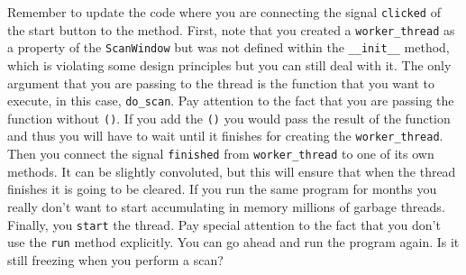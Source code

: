 Remember to update the code where you are connecting the signal
\texttt{clicked} of the start button to the method. First, note that you
created a \texttt{worker_thread} as a property of the
\texttt{ScanWindow} but was not defined within the \texttt{__init__}
method, which is violating some design principles but you can still deal
with it. The only argument that you are passing to the thread is the
function that you want to execute, in this case, \texttt{do_scan}. Pay
attention to the fact that you are passing the function without
\texttt{()}. If you add the \texttt{()} you would pass the result of the
function and thus you will have to wait until it finishes for creating
the \texttt{worker\_thread}. Then you connect the signal
\texttt{finished} from \texttt{worker_thread} to one of its own
methods. It can be slightly convoluted, but this will ensure that when
the thread finishes it is going to be cleared. If you run the same
program for months you really don't want to start accumulating in memory
millions of garbage threads. Finally, you \texttt{start} the thread. Pay
special attention to the fact that you don't use the \texttt{run} method
explicitly. You can go ahead and run the program again. Is it still
freezing when you perform a scan?






